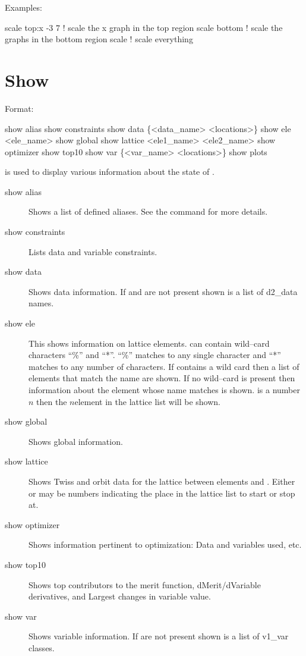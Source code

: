Examples:
\begin{example}
  scale top:x -3  7  ! scale the x graph in the top region
  scale bottom       ! scale the graphs in the bottom region
  scale              ! scale everything
\end{example}


\section{Show}
\label{s:show}

Format:
\begin{example}
  show alias                     
  show constraints
  show data \{<data_name> <locations>\} 
  show ele <ele_name>
  show global
  show lattice <ele1_name> <ele2_name>
  show optimizer
  show top10
  show var \{<var_name> <locations>\}
  show plots
\end{example}

\vskip 0.2in
 is used to display various information about the state of \tao.
\begin{description}
\item[show alias]
Shows a list of defined aliases. See the  command for more
details.
\item[show constraints]
Lists data and variable constraints.
\item[show data]
Shows data information. If  and  are not
present shown is a list of d2\_data names.
\item[show ele]
This shows information on lattice elements.  can
contain wild--card characters ``\%'' and ``*''. ``\%'' matches to any
single character and ``*'' matches to any number of characters. If
 contains a wild card then a list of elements that
match the name are shown. If no wild--card is present then information
about the element whose name matches  is
shown.  is a number $n$ then the $n$\Th element in the
lattice list will be shown.
\item[show global]
Shows global information.
\item[show lattice]
Shows Twiss and orbit data for the  lattice between elements
 and . Either  or
 may be numbers indicating the place in the lattice
list to start or stop at.
\item[show optimizer]
Shows information pertinent to optimization: Data and variables used, etc.
\item[show top10]
Shows top contributors to the merit function, dMerit/dVariable
derivatives, and Largest changes in variable value.
\item[show var]
Shows variable information. If   are
not present shown is a list of v1\_var classes.
\end{description}


